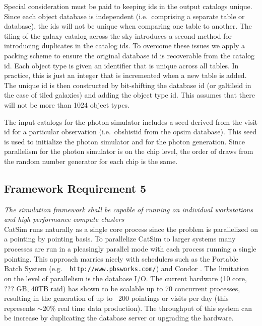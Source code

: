 \documentclass[]{article}
\begin{document}
Special consideration must be paid to keeping ids in the output
catalogs unique.  Since each object database is independent (i.e.\
comprising a separate table or database), the ids will not be unique
when comparing one table to another. The tiling of the galaxy catalog
across the sky introduces a second method for introducing duplicates
in the catalog ids. To overcome these issues we apply a packing scheme
to ensure the original database id is recoverable from the catalog id.
Each object type is given an identifier that is unique across all
tables.  In practice, this is just an integer that is incremented when
a new table is added.  The unique id is then constructed by
bit-shifting the database id (or galtileid in the case of tiled
galaxies) and adding the object type id.  This assumes that there  will
not be more than 1024 object types.  

The input catalogs for the photon simulator includes a seed derived
from the visit id for a particular observation (i.e.\ obshistid from
the opsim database). This seed is used to initialize the photon
simulator and for the photon generation. Since parallelism for the
photon simulator is on the chip level, the order of draws from the
random number generator for each chip is the same.


\subsection{Framework Requirement 5}

{\it The simulation framework shall be capable of running on individual workstations 
and high performance compute clusters}\\


CatSim runs naturally as a single core process since the problem is
parallelized on a pointing by pointing basis.  To parallelize CatSim
to larger systems many processes are run in a pleasingly parallel mode
with each process running a single pointing.  This approach marries
nicely with schedulers such as the Portable Batch System (e.g.\ {\tt
  http://www.pbsworks.com/}) and Condor \citep{condor}.  The
limitation on the level of parallelism is the database I/O.  The
current hardware (10 core, ??? GB, 40TB raid) has shown to be scalable
up to 70 concurrent processes, resulting in the generation of up to
~200 pointings or visits per day (this represents $\sim$20\% real time
data production).  The throughput of this system can be increase by
duplicating the database server or 
upgrading the hardware.
\end{document}
